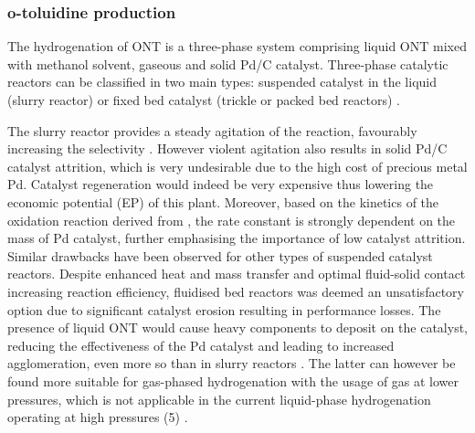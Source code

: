 
\subsubsection{o-toluidine production} \label{sec:otol}

The hydrogenation of ONT is a three-phase system comprising liquid ONT mixed with methanol solvent, gaseous  and solid Pd/C catalyst. Three-phase catalytic reactors can be classified in two main types: suspended catalyst in the liquid (slurry reactor) or fixed bed catalyst (trickle or packed bed reactors) \cite{wood_methodological_nodate}. 

The slurry reactor provides a steady agitation of the reaction, favourably increasing the selectivity \cite{p_a_ramachandran_recent_1987}. However violent agitation also results in solid Pd/C catalyst attrition, which is very undesirable due to the high cost of precious metal Pd. Catalyst regeneration would indeed be very expensive thus lowering the economic potential (EP) of this plant. Moreover, based on the kinetics of the oxidation reaction derived from  \textcite{rajadhyaksha_solvent_1986}, the rate constant is strongly dependent on the mass of Pd catalyst, further emphasising the importance of low catalyst attrition. Similar drawbacks have been observed for other types of suspended catalyst reactors. Despite enhanced heat and mass transfer and optimal fluid-solid contact increasing reaction efficiency, fluidised bed reactors was deemed an unsatisfactory option due to significant catalyst erosion resulting in performance losses. The presence of liquid ONT would cause heavy components to deposit on the catalyst, reducing the effectiveness of the Pd catalyst and leading to increased agglomeration, even more so than in slurry reactors \cite{farrell_kinetics_1979}. The latter can however be found more suitable for gas-phased hydrogenation with the usage of  gas at lower pressures, which is not applicable in the current liquid-phase hydrogenation operating at high pressures (\SI{5}{\atm}) \cite{ranade_chapter_2011}.

